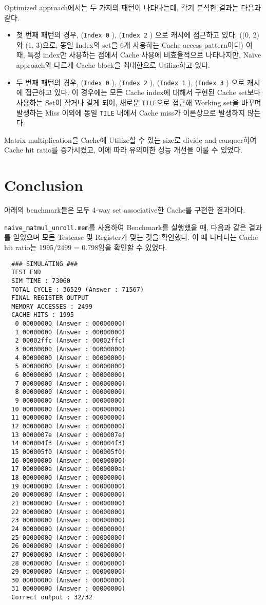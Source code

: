 \documentclass{scrartcl}
\begin{document}
Optimized approach에서는 두 가지의 패턴이 나타나는데, 각기 분석한 결과는 다음과 같다.
\begin{itemize}
  \item 첫 번째 패턴의 경우, (\texttt{Index 0} ), (\texttt{Index 2} ) 으로 캐시에 접근하고 있다. ((0, 2) 와 (1, 3)으로, 동일 Index의 set을 6개 사용하는 Cache access pattern이다)
  이 때, 특정 index만 사용하는 점에서 Cache 사용에 비효율적으로 나타나지만, Naïve approach와 다르게 Cache block을 최대한으로 Utilize하고 있다.
  \item 두 번째 패턴의 경우, (\texttt{Index 0} ), (\texttt{Index 2} ), (\texttt{Index 1} ), (\texttt{Index 3} ) 으로 캐시에 접근하고 있다.
  이 경우에는 모든 Cache index에 대해서 구현된 Cache set보다 사용하는 Set이 작거나 같게 되어, 새로운 \texttt{TILE}으로 접근해 Working set을 바꾸며 발생하는 Miss 이외에 동일 \texttt{TILE} 내에서 Cache miss가
  이론상으로 발생하지 않는다.
\end{itemize}

Matrix multiplication을 Cache에 Utilize할 수 있는 size로 divide-and-conquer하여 Cache hit ratio를 증가시켰고, 이에 따라 유의미한 성능 개선을 이룰 수 있었다.

\section{Conclusion}
아래의 benchmark들은 모두 4-way set associative한 Cache를 구현한 결과이다.

\texttt{naive\_matmul\_unroll.mem}를 사용하여 Benchmark를 실행했을 때, 다음과 같은 결과를 얻었으며 모든 Testcase 및 Register가 맞는 것을 확인했다.
이 때 나타나는 Cache hit ratio는 1995/2499 = 0.798임을 확인할 수 있었다.
\begin{lstlisting}
  ### SIMULATING ###
  TEST END
  SIM TIME : 73060
  TOTAL CYCLE : 36529 (Answer : 71567)
  FINAL REGISTER OUTPUT
  MEMORY ACCESSES : 2499
  CACHE HITS : 1995
   0 00000000 (Answer : 00000000)
   1 00000000 (Answer : 00000000)
   2 00002ffc (Answer : 00002ffc)
   3 00000000 (Answer : 00000000)
   4 00000000 (Answer : 00000000)
   5 00000000 (Answer : 00000000)
   6 00000000 (Answer : 00000000)
   7 00000000 (Answer : 00000000)
   8 00000000 (Answer : 00000000)
   9 00000000 (Answer : 00000000)
  10 00000000 (Answer : 00000000)
  11 00000000 (Answer : 00000000)
  12 00000000 (Answer : 00000000)
  13 0000007e (Answer : 0000007e)
  14 000004f3 (Answer : 000004f3)
  15 000005f0 (Answer : 000005f0)
  16 00000000 (Answer : 00000000)
  17 0000000a (Answer : 0000000a)
  18 00000000 (Answer : 00000000)
  19 00000000 (Answer : 00000000)
  20 00000000 (Answer : 00000000)
  21 00000000 (Answer : 00000000)
  22 00000000 (Answer : 00000000)
  23 00000000 (Answer : 00000000)
  24 00000000 (Answer : 00000000)
  25 00000000 (Answer : 00000000)
  26 00000000 (Answer : 00000000)
  27 00000000 (Answer : 00000000)
  28 00000000 (Answer : 00000000)
  29 00000000 (Answer : 00000000)
  30 00000000 (Answer : 00000000)
  31 00000000 (Answer : 00000000)
  Correct output : 32/32
\end{lstlisting}
\end{document}
